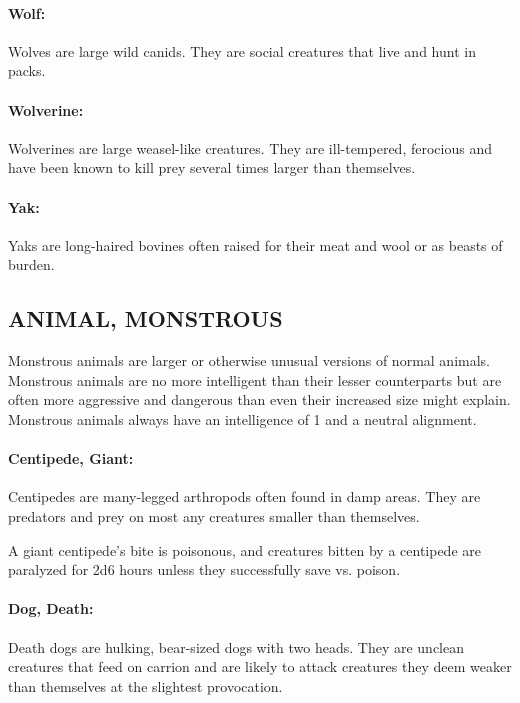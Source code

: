 \begin{multicols}{2}
\paragraph{Wolf:} Wolves are large wild canids. They are social creatures that live and hunt in packs. 

\paragraph{Wolverine:} Wolverines are large weasel-like creatures. They are ill-tempered, ferocious and have been known to kill prey several times larger than themselves.

\paragraph{Yak:} Yaks are long-haired bovines often raised for their meat and wool or as beasts of burden.


\subsection{ANIMAL, MONSTROUS} 

Monstrous animals are larger or otherwise unusual versions of normal animals. Monstrous animals are no more intelligent than their lesser counterparts but are often more aggressive and dangerous than even their increased size might explain. Monstrous animals always have an intelligence of 1 and a neutral alignment.

\paragraph{Centipede, Giant:} Centipedes are many-legged arthropods often found in damp areas. They are predators and prey on most any creatures smaller than themselves.

A giant centipede's bite is poisonous, and creatures bitten by a centipede are paralyzed for 2d6 hours unless they successfully save vs. poison.

\paragraph{Dog, Death:} Death dogs are hulking, bear-sized dogs with two heads. They are unclean creatures that feed on carrion and are likely to attack creatures they deem weaker than themselves at the slightest provocation.


\end{multicols}
